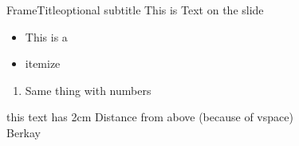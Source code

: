  
\begin{frame}[plain]{FrameTitle}{optional subtitle}
	This is Text on the slide
	\begin{itemize}
		\item This is a 
		\item itemize
	\end{itemize}
	\begin{enumerate}
		\item Same thing with numbers
	\end{enumerate}
	\vspace{2cm}
	this text has 2cm Distance from above (because of vspace)\\ %
	Berkay
\end{frame}